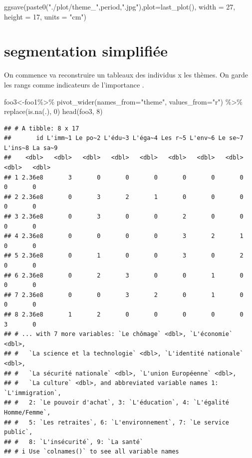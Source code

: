 \documentclass[
]{book}
\newenvironment{Shaded}{\begin{snugshade}}{\end{snugshade}}
\newcommand{\AttributeTok}[1]{\textcolor[rgb]{0.77,0.63,0.00}{#1}}
\newcommand{\DecValTok}[1]{\textcolor[rgb]{0.00,0.00,0.81}{#1}}
\newcommand{\FunctionTok}[1]{\textcolor[rgb]{0.00,0.00,0.00}{#1}}
\newcommand{\NormalTok}[1]{#1}
\newcommand{\OtherTok}[1]{\textcolor[rgb]{0.56,0.35,0.01}{#1}}
\newcommand{\SpecialCharTok}[1]{\textcolor[rgb]{0.00,0.00,0.00}{#1}}
\newcommand{\StringTok}[1]{\textcolor[rgb]{0.31,0.60,0.02}{#1}}
\begin{document}
\begin{Shaded}
\begin{Highlighting}[]
\FunctionTok{ggsave}\NormalTok{(}\FunctionTok{paste0}\NormalTok{(}\StringTok{"./plot/theme\_"}\NormalTok{,period,}\StringTok{".jpg"}\NormalTok{),}\AttributeTok{plot=}\FunctionTok{last\_plot}\NormalTok{(), }\AttributeTok{width =} \DecValTok{27}\NormalTok{, }\AttributeTok{height =} \DecValTok{17}\NormalTok{, }\AttributeTok{units =} \StringTok{"cm"}\NormalTok{)}
\end{Highlighting}
\end{Shaded}

\hypertarget{segmentation-simplifiuxe9e}{%
\section{segmentation simplifiée}\label{segmentation-simplifiuxe9e}}

On commence va reconstruire un tableaux des individus x les thèmes. On garde les rangs comme indicateurs de l'importance .

\begin{Shaded}
\begin{Highlighting}[]
\NormalTok{foo3}\OtherTok{\textless{}{-}}\NormalTok{foo1}\SpecialCharTok{\%\textgreater{}\%}  
  \FunctionTok{pivot\_wider}\NormalTok{(}\AttributeTok{names\_from=}\StringTok{"theme"}\NormalTok{, }\AttributeTok{values\_from=}\StringTok{"r"}\NormalTok{) }\SpecialCharTok{\%\textgreater{}\%}
  \FunctionTok{replace}\NormalTok{(}\FunctionTok{is.na}\NormalTok{(.), }\DecValTok{0}\NormalTok{)}
\FunctionTok{head}\NormalTok{(foo3, }\DecValTok{8}\NormalTok{)}
\end{Highlighting}
\end{Shaded}

\begin{verbatim}
## # A tibble: 8 x 17
##       id L'imm~1 Le po~2 L'édu~3 L'éga~4 Les r~5 L'env~6 Le se~7 L'ins~8 La sa~9
##    <dbl>   <dbl>   <dbl>   <dbl>   <dbl>   <dbl>   <dbl>   <dbl>   <dbl>   <dbl>
## 1 2.36e8       3       0       0       0       0       0       0       0       0
## 2 2.36e8       0       3       2       1       0       0       0       0       0
## 3 2.36e8       0       3       0       0       2       0       0       0       0
## 4 2.36e8       0       0       0       0       3       2       1       0       0
## 5 2.36e8       0       1       0       0       3       0       2       0       0
## 6 2.36e8       0       2       3       0       0       1       0       0       0
## 7 2.36e8       0       0       3       2       0       1       0       0       0
## 8 2.36e8       1       2       0       0       0       0       0       3       0
## # ... with 7 more variables: `Le chômage` <dbl>, `L'économie` <dbl>,
## #   `La science et la technologie` <dbl>, `L'identité nationale` <dbl>,
## #   `La sécurité nationale` <dbl>, `L'union Européenne` <dbl>,
## #   `La culture` <dbl>, and abbreviated variable names 1: `L'immigration`,
## #   2: `Le pouvoir d'achat`, 3: `L'éducation`, 4: `L'égalité Homme/Femme`,
## #   5: `Les retraites`, 6: `L'environnement`, 7: `Le service public`,
## #   8: `L'insécurité`, 9: `La santé`
## # i Use `colnames()` to see all variable names
\end{verbatim}
\end{document}
